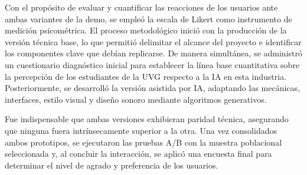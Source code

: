 Con el propósito de evaluar y cuantificar las reacciones de los usuarios ante ambas variantes de la demo, se empleó la escala de Likert como instrumento de medición psicométrica. El proceso metodológico inició con la producción de la versión técnica base, lo que permitió delimitar el alcance del proyecto e identificar los componentes clave que debían replicarse. De manera simultánea, se administró un cuestionario diagnóstico inicial para establecer la línea base cuantitativa sobre la percepción de los estudiantes de la UVG respecto a la IA en esta industria. Posteriormente, se desarrolló la versión asistida por IA, adaptando las mecánicas, interfaces, estilo visual y diseño sonoro mediante algoritmos generativos. 

Fue indispensable que ambas versiones exhibieran paridad técnica, asegurando que ninguna fuera intrínsecamente superior a la otra. Una vez consolidados ambos prototipos, se ejecutaron las pruebas A/B con la muestra poblacional seleccionada y, al concluir la interacción, se aplicó una encuesta final para determinar el nivel de agrado y preferencia de los usuarios.